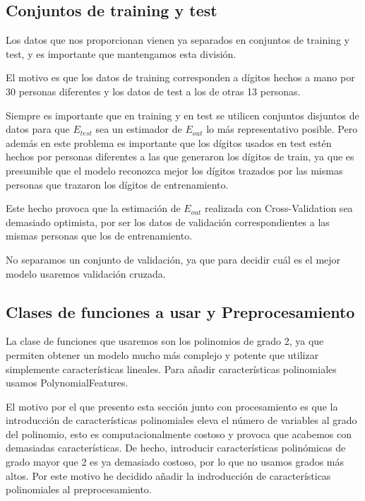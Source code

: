 \documentclass[a4]{article}
\begin{document}
\subsection{Conjuntos de training y test}

Los datos que nos proporcionan vienen ya separados en conjuntos de
training y test, y es importante que mantengamos esta división.

El motivo es que los datos de training corresponden a dígitos hechos a
mano por 30 personas diferentes y los datos de test a los de otras 13
personas.

Siempre es importante que en training y en test se utilicen conjuntos
disjuntos de datos para que $E_{test}$ sea un estimador de $E_{out}$
lo más representativo posible. Pero además en este problema es
importante que los dígitos usados en test estén hechos por personas
diferentes a las que generaron los dígitos de train, ya que es
presumible que el modelo reconozca mejor los dígitos trazados por las
mismas personas que trazaron los dígitos de entrenamiento.

Este hecho provoca que la estimación de $E_{out}$ realizada con
Cross-Validation sea demasiado optimista, por ser los datos de
validación correspondientes a las mismas personas que los de
entrenamiento. \label{cv-optimistic}

No separamos un conjunto de validación, ya que para decidir cuál es el
mejor modelo usaremos validación cruzada.

\subsection{Clases de funciones a usar y Preprocesamiento}

La clase de funciones que usaremos son los polinomios de grado 2, ya
que permiten obtener un modelo mucho más complejo y potente que
utilizar simplemente características lineales. Para añadir
características polinomiales usamos PolynomialFeatures.

El motivo por el que presento esta sección junto con procesamiento es
que la introducción de características polinomiales eleva el número de
variables al grado del polinomio, esto es computacionalmente costoso y
provoca que acabemos con demasiadas características. De hecho,
introducir características polinómicas de grado mayor que 2 es ya
demasiado costoso, por lo que no usamos grados más altos. Por este
motivo he decidido añadir la indroducción de características
polinomiales al preprocesamiento.
\end{document}
